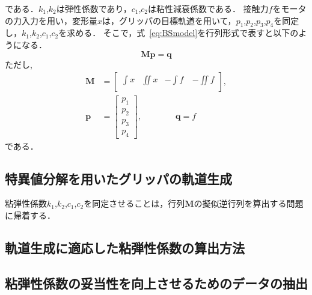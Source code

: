 \documentclass[a4paper]{jarticle}
\begin{document}
である．$k_1$,$k_2$は弾性係数であり，$c_1$,$c_2$は粘性減衰係数である．
接触力$f$をモータの力入力を用い，変形量$x$は，グリッパの目標軌道を用いて，$p_1$,$p_2$,$p_3$,$p_4$を同定し，$k_1$,$k_2$,$c_1$,$c_2$を求める．
そこで，式~\eqref{eq:BSmodel}を行列形式で表すと以下のようになる．
\begin{equation}
    \mathbf{M}\mathbf{p} = \mathbf{q} 
\end{equation}
ただし,
\begin{equation}
    \begin{aligned}
        \mathbf{M} &= \begin{bmatrix}
            \int{x} & \iint{x} & -\int{f}\ & -\iint{f}\\
        \end{bmatrix}, \\
        \mathbf{p}  &= \begin{bmatrix}
            p_1 \\
            p_2 \\
            p_3 \\
            p_4
        \end{bmatrix}, \quad\quad\quad\quad
        \mathbf{q}   = f
    \end{aligned}
\end{equation}
である．
\subsection{特異値分解を用いたグリッパの軌道生成}
粘弾性係数$k_1$,$k_2$,$c_1$,$c_2$を同定させることは，行列$\mathbf{M}$の擬似逆行列を算出する問題に帰着する．
\subsection{軌道生成に適応した粘弾性係数の算出方法}
\subsection{粘弾性係数の妥当性を向上させるためのデータの抽出}
\end{document}
